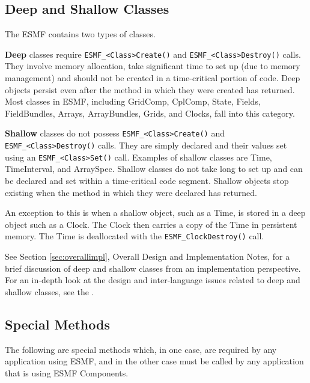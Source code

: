\subsection{Deep and Shallow Classes}
\label{sec:deepshallow}

The ESMF contains two types of classes.

{\bf Deep} classes require
{\tt ESMF\_<Class>Create()} and {\tt ESMF\_<Class>Destroy()} calls.
They involve memory allocation, take significant time to set up (due to
memory management) and should not be created in a time-critical portion of code.
Deep objects persist even after the method in which they were created has
returned. Most classes in ESMF, including GridComp, CplComp, State, Fields, FieldBundles, Arrays, ArrayBundles, Grids, and Clocks, fall into this category.

{\bf Shallow} classes do not possess {\tt ESMF\_<Class>Create()}
and {\tt ESMF\_<Class>Destroy()} calls.  They are simply declared
and their values set using an {\tt ESMF\_<Class>Set()} call.  
Examples of shallow classes are Time, TimeInterval, and ArraySpec.  Shallow classes do not take long to set up and can be declared and set within
a time-critical code segment.  Shallow objects stop existing when
the method in which they were declared has returned.  

An exception to this is when a shallow object, such as a Time, 
is stored in a deep object such as a Clock.  The Clock then
carries a copy of the Time in persistent memory.  The Time is
deallocated with the {\tt ESMF\_ClockDestroy()} call.

See Section \ref{sec:overallimpl}, Overall Design and Implementation 
Notes, for a brief discussion of deep and shallow classes from 
an implementation perspective.  For an in-depth look at the design 
and inter-language issues related to deep and shallow classes,
see the .

\subsection{Special Methods}

The following are special methods which, in one case,
are required by any application using ESMF, and in the 
other case must be called by any application that is using 
ESMF Components.

